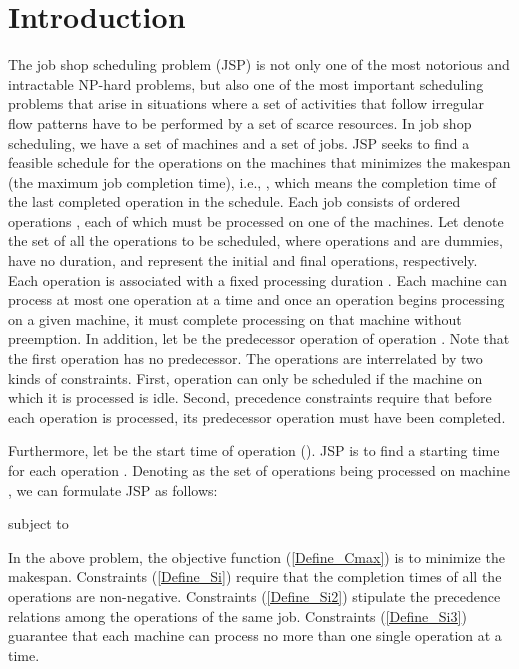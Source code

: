 \documentclass[authoryear,12pt]{elsarticle}
\begin{document}
\section{Introduction}
\label{Sec_Intro}
The job shop scheduling problem (JSP) is not only one of the most notorious and intractable NP-hard problems, but also one of the most important scheduling problems that arise in situations where a set of activities that follow irregular flow patterns have to be performed by a set of scarce resources. In job shop scheduling, we have a set  of  machines and a set  of  jobs. JSP seeks to find a feasible schedule for the operations on the machines that minimizes the makespan (the maximum job completion time), i.e., , which means the completion time of the last completed operation in the schedule. Each job  consists of  ordered operations , each of which must be processed on one of the  machines. Let  denote the set of all the operations to be scheduled, where operations  and  are dummies, have no duration, and represent the initial and final operations, respectively. Each operation  is associated with a fixed processing duration . Each machine can process at most one operation at a time and once an operation begins processing on a given machine, it must complete processing on that machine without preemption. In addition, let  be the predecessor operation of operation . Note that the first operation has no predecessor. The operations are interrelated by two kinds of constraints. First, operation  can only be scheduled if the machine on which it is processed is idle. Second, precedence constraints require that before each operation  is processed, its predecessor operation  must have been completed.

Furthermore, let  be the start time of operation  (). JSP is to find a starting time for each operation . Denoting  as the set of operations being processed on machine , we can formulate JSP as follows:


subject to




In the above problem, the objective function (\ref{Define_Cmax}) is to minimize the makespan. Constraints (\ref{Define_Si}) require that the completion times of all the operations are non-negative. Constraints (\ref{Define_Si2}) stipulate the precedence relations among the operations of the same job. Constraints (\ref{Define_Si3}) guarantee that each machine can process no more than one single operation at a time.
\end{document}
